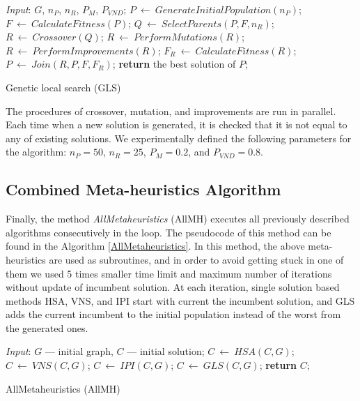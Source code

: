 \documentclass[runningheads]{llncs}
\begin{document}
\begin{algorithm}[!hbtp]
\begin{algorithmic}[1]
\STATE \emph{Input}: $G$, $n_P$, $n_R$, $P_M$, $P_{VND}$;
\STATE $P \: \leftarrow \: GenerateInitialPopulation(n_P)$;
    \STATE $F \: \leftarrow \: CalculateFitness(P)$;
		\STATE $Q \: \leftarrow \: SelectParents(P, F, n_R)$;
		\STATE $R \: \leftarrow \: Crossover(Q)$;
		\STATE $R \: \leftarrow \: PerformMutations(R)$;
		\STATE $R \: \leftarrow \: PerformImprovements(R)$;
    \STATE $F_R \: \leftarrow \: CalculateFitness(R)$;
		\STATE $P \: \leftarrow \: Join(R, P, F, F_R)$;
\ENDWHILE
\STATE \textbf{return} the best solution of $P$;
\end{algorithmic}
\caption{Genetic local search (GLS)} \label{GLS}
\end{algorithm}

The procedures of crossover, mutation, and improvements are run in parallel. Each time when a new solution is generated, it is checked that it is not equal to any of existing solutions. We experimentally defined the following parameters for the algorithm: $n_P = 50$, $n_R = 25$, $P_M = 0.2$, and $P_{VND} = 0.8$.


\subsection{Combined Meta-heuristics Algorithm}
Finally, the method \textit{AllMetaheuristics} (AllMH) executes all previously described algorithms consecutively in the loop. The pseudocode of this method can be found in the Algorithm \ref{AllMetaheuristics}. In this method, the above meta-heuristics are used as subroutines, and in order to avoid getting stuck in one of them we used 5 times smaller time limit and maximum number of iterations without update of incumbent solution. At each iteration, single solution based methods HSA, VNS, and IPI start with current the incumbent solution, and GLS adds the current incumbent to the initial population instead of the worst from the generated ones.

\begin{algorithm}[!hbtp]
\begin{algorithmic}[1]
\STATE \emph{Input}: $G$ --- initial graph, $C$ --- initial solution;
		\STATE $C \: \leftarrow \: HSA(C, G)$;
		\STATE $C \: \leftarrow \: VNS(C, G)$;
		\STATE $C \: \leftarrow \: IPI(C, G)$;
		\STATE $C \: \leftarrow \: GLS(C, G)$;
\ENDWHILE
\STATE \textbf{return} $C$;
\end{algorithmic}
\caption{AllMetaheuristics (AllMH)} \label{AllMetaheuristics}
\end{algorithm}
\end{document}
